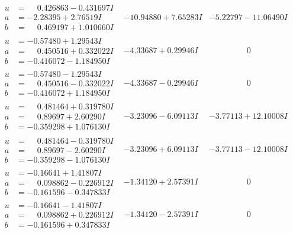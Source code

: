 \documentclass[1p]{elsarticle_modified}
\theoremstyle{definition}
\begin{document}
$$\begin{array}{c|c|c}
\begin{aligned}
u &= \phantom{-}0.426863 - 0.431697 I \\
a &= -2.28395 + 2.76519 I \\
b &= \phantom{-}0.469197 + 1.010660 I\end{aligned}
 & -10.94880 + 7.65283 I & -5.22797 - 11.06490 I \\ \hline\begin{aligned}
u &= -0.57480 + 1.29543 I \\
a &= \phantom{-}0.450516 + 0.332022 I \\
b &= -0.416072 - 1.184950 I\end{aligned}
 & -4.33687 + 0.29946 I & \phantom{-0.000000 } 0 \\ \hline\begin{aligned}
u &= -0.57480 - 1.29543 I \\
a &= \phantom{-}0.450516 - 0.332022 I \\
b &= -0.416072 + 1.184950 I\end{aligned}
 & -4.33687 - 0.29946 I & \phantom{-0.000000 } 0 \\ \hline\begin{aligned}
u &= \phantom{-}0.481464 + 0.319780 I \\
a &= \phantom{-}0.89697 + 2.60290 I \\
b &= -0.359298 + 1.076130 I\end{aligned}
 & -3.23096 - 6.09113 I & -3.77113 + 12.10008 I \\ \hline\begin{aligned}
u &= \phantom{-}0.481464 - 0.319780 I \\
a &= \phantom{-}0.89697 - 2.60290 I \\
b &= -0.359298 - 1.076130 I\end{aligned}
 & -3.23096 + 6.09113 I & -3.77113 - 12.10008 I \\ \hline\begin{aligned}
u &= -0.16641 + 1.41807 I \\
a &= \phantom{-}0.098862 - 0.226912 I \\
b &= -0.161596 - 0.347833 I\end{aligned}
 & -1.34120 + 2.57391 I & \phantom{-0.000000 } 0 \\ \hline\begin{aligned}
u &= -0.16641 - 1.41807 I \\
a &= \phantom{-}0.098862 + 0.226912 I \\
b &= -0.161596 + 0.347833 I\end{aligned}
 & -1.34120 - 2.57391 I & \phantom{-0.000000 } 0 \\ \hline\begin{aligned}

\end{aligned}
\end{array}$$
\end{document}
